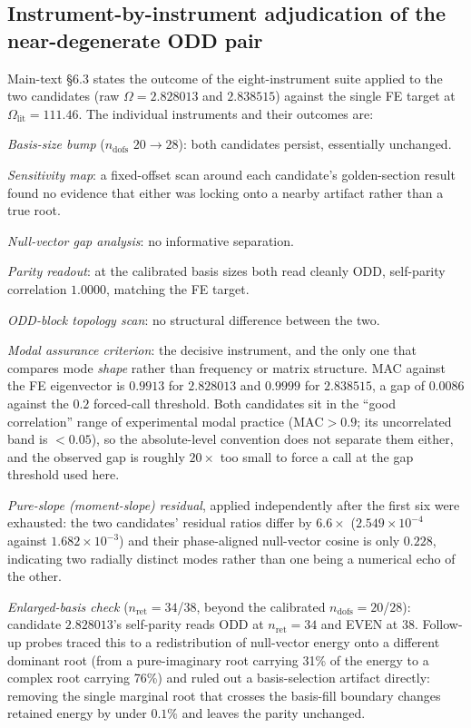 \documentclass[11pt]{article}
\begin{document}
\subsection{Instrument-by-instrument adjudication of the near-degenerate
ODD pair}\label{sec:instruments}
Main-text \S6.3 states the outcome of the eight-instrument suite applied
to the two candidates (raw $\Omega=2.828013$ and $2.838515$) against the
single FE target at $\Omega_{\mathrm{lit}}=111.46$. The individual
instruments and their outcomes are:

\begin{enumerate}\itemsep2pt
\item \emph{Basis-size bump} ($n_{\mathrm{dofs}}$ $20\to28$): both
candidates persist, essentially unchanged.
\item \emph{Sensitivity map}: a fixed-offset scan around each candidate's
golden-section result found no evidence that either was locking onto a
nearby artifact rather than a true root.
\item \emph{Null-vector gap analysis}: no informative separation.
\item \emph{Parity readout}: at the calibrated basis sizes both read cleanly
ODD, self-parity correlation $1.0000$, matching the FE target.
\item \emph{ODD-block topology scan}: no structural difference between the
two.
\item \emph{Modal assurance criterion}: the decisive instrument, and the
only one that compares mode \emph{shape} rather than frequency or matrix
structure. MAC against the FE eigenvector is $0.9913$ for $2.828013$ and
$0.9999$ for $2.838515$, a gap of $0.0086$ against the $0.2$ forced-call
threshold. Both candidates sit in the ``good correlation'' range of
experimental modal practice \cite{allemang2003} ($\mathrm{MAC}>0.9$; its
uncorrelated band is $<0.05$), so the absolute-level convention does not
separate them either, and the observed gap is roughly $20\times$ too small
to force a call at the gap threshold used here.
\item \emph{Pure-slope (moment-slope) residual}, applied independently after
the first six were exhausted: the two candidates' residual ratios differ by
$6.6\times$ ($2.549\times10^{-4}$ against $1.682\times10^{-3}$) and their
phase-aligned null-vector cosine is only $0.228$, indicating two radially
distinct modes rather than one being a numerical echo of the other.
\begin{sloppypar}
\item \emph{Enlarged-basis check} ($n_{\mathrm{ret}}=34$/$38$, beyond the
calibrated $n_{\mathrm{dofs}}=20$/$28$): candidate $2.828013$'s self-parity
reads ODD at $n_{\mathrm{ret}}=34$ and EVEN at $38$. Follow-up probes traced
this to a redistribution of null-vector energy onto a different dominant
root (from a pure-imaginary root carrying 31\% of the energy to a complex
root carrying 76\%) and ruled out a basis-selection artifact directly:
removing the single marginal root that crosses the basis-fill
boundary changes retained energy by under $0.1\%$ and leaves the parity
unchanged.
\end{sloppypar}
\end{enumerate}
\end{document}
